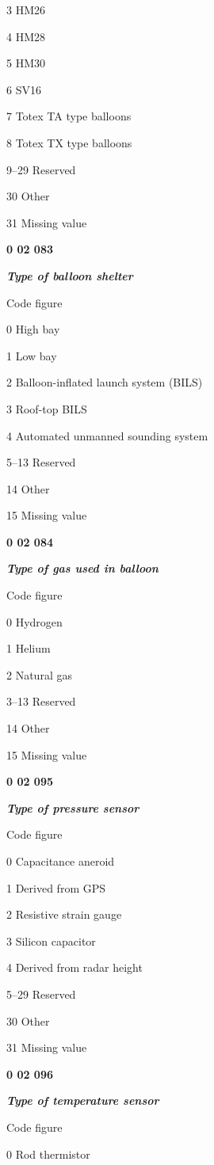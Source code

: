 3 HM26

4 HM28

5 HM30

6 SV16

7 Totex TA type balloons

8 Totex TX type balloons

9--29 Reserved

30 Other

31 Missing value

\textbf{0 02 083}

\emph{\textbf{Type of balloon shelter}}

Code figure

0 High bay

1 Low bay

2 Balloon-inflated launch system (BILS)

3 Roof-top BILS

4 Automated unmanned sounding system

5--13 Reserved

14 Other

15 Missing value

\textbf{0 02 084}

\emph{\textbf{Type of gas used in balloon}}

Code figure

0 Hydrogen

1 Helium

2 Natural gas

3--13 Reserved

14 Other

15 Missing value

\textbf{0 02 095}

\emph{\textbf{Type of pressure sensor}}

Code figure

0 Capacitance aneroid

1 Derived from GPS

2 Resistive strain gauge

3 Silicon capacitor

4 Derived from radar height

5--29 Reserved

30 Other

31 Missing value

\textbf{0 02 096}

\emph{\textbf{Type of temperature sensor}}

Code figure

0 Rod thermistor

